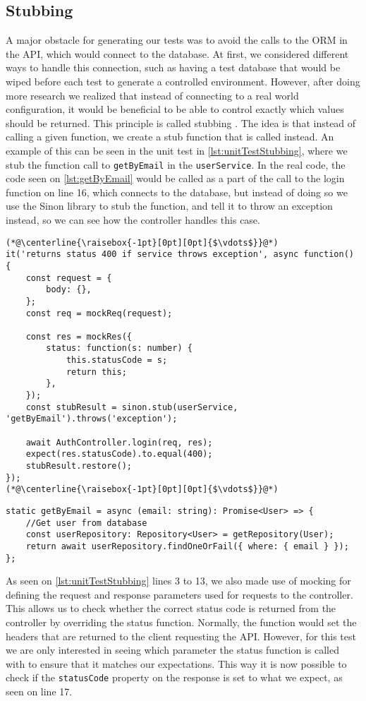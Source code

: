 \subsection{Stubbing}
A major obstacle for generating our tests was to avoid the calls to the ORM in the API, which would connect to the database.
At first, we considered different ways to handle this connection, such as having a test database that would be wiped before each test to generate a controlled environment.
However, after doing more research we realized that instead of connecting to a real world configuration, it would be beneficial to be able to control exactly which values should be returned.
This principle is called stubbing \cite{SoftwareTesting}.
The idea is that instead of calling a given function, we create a stub function that is called instead.
An example of this can be seen in the unit test in \autoref{lst:unitTestStubbing}, where we stub the function call to \texttt{getByEmail} in the \texttt{userService}.
In the real code, the code seen on \autoref{lst:getByEmail} would be called as a part of the call to the login function on line 16, which connects to the database, but instead of doing so we use the Sinon library to stub the function, and tell it to throw an exception instead, so we can see how the controller handles this case.

\begin{lstlisting}[caption={Unit test with stubbing},label={lst:unitTestStubbing}]
(*@\centerline{\raisebox{-1pt}[0pt][0pt]{$\vdots$}}@*)
it('returns status 400 if service throws exception', async function() {
    const request = {
        body: {},
    };
    const req = mockReq(request);

    const res = mockRes({
        status: function(s: number) {
            this.statusCode = s;
            return this;
        },
    });
    const stubResult = sinon.stub(userService, 'getByEmail').throws('exception');

    await AuthController.login(req, res);
    expect(res.statusCode).to.equal(400);
    stubResult.restore();
});
(*@\centerline{\raisebox{-1pt}[0pt][0pt]{$\vdots$}}@*)
\end{lstlisting}

\begin{lstlisting}[caption={Actual getByEmail function},label={lst:getByEmail}]
static getByEmail = async (email: string): Promise<User> => {
    //Get user from database
    const userRepository: Repository<User> = getRepository(User);
    return await userRepository.findOneOrFail({ where: { email } });
};
\end{lstlisting}
As seen on \autoref{lst:unitTestStubbing} lines 3 to 13, we also made use of mocking for defining the request and response parameters used for requests to the controller.
This allows us to check whether the correct status code is returned from the controller by overriding the status function.
Normally, the function would set the headers that are returned to the client requesting the API.
However, for this test we are only interested in seeing which parameter the status function is called with to ensure that it matches our expectations.
This way it is now possible to check if the \texttt{statusCode} property on the response is set to what we expect, as seen on line 17.

